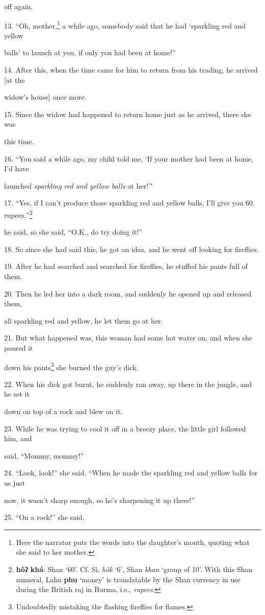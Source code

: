 off again.

13. ``Oh, mother,\footnote{Here the narrator puts the words into the daughter's mouth, quoting what she said to her mother.} a while ago, somebody said that he had `sparkling red and
yellow

balls' to launch at you, if only you had been at home!''

14. After this, when the time came for him to return from his trading, he arrived
[at the

widow's house] once more.

15. Since the widow had happened to return home just as he arrived, there she was


this time.

16. ``You said a while ago, my child told me, `If your mother had been at home,
I'd have

launched \textit{sparkling red and yellow balls} at her!'"

17. ``Yes, if I can't produce those sparkling red and yellow balls, I'll give you
60. rupees,''\footnote{\textbf{hôʔ} \textbf{khá}: Shan `60'. Cf. Si. \textit{hòk }`6', Shan \textit{khan} `group of 10'. With this Shan numeral, Lahu \textbf{phu} `money' is translatable by the Shan currency in use during the British raj in Burma, i.e., \textit{rupees}.}

he said, so she said, ``O.K., do try doing it!''

18. So since she had said this, he got an idea, and he went off looking for fireflies.

19. After he had searched and searched for fireflies, he stuffed his pants full
of them.

20. Then he led her into a dark room, and suddenly he opened up and released them,


all sparkling red and yellow, he let them go at her.

21. But what happened was, this woman had some hot water on, and when she poured
it

down his pants\footnote{Undoubtedly mistaking the flashing fireflies for flames.} she burned the guy's dick.

22. When his dick got burnt, he suddenly ran away, up there in the jungle, and
he set it

down on top of a rock and blew on it.

23. While he was trying to cool it off in a breezy place, the little girl followed
him, and

said, ``Mommy, mommy!''

24. ``Look, look!'' she said. ``When he made the sparkling red and yellow balls
for us just

now, it wasn't sharp enough, so he's sharpening it up there!''

25. ``On a rock!'' she said.

